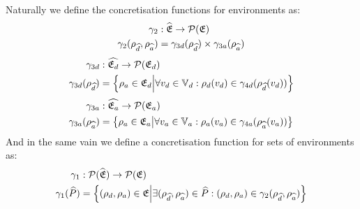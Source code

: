 Naturally we define the concretisation functions for environments as:
\begin{align}
    \gamma_2 &: \widehat{\mathfrak{E}} \rightarrow \mathcal{P}(\mathfrak{E}) \\
    \gamma_2(\rho_{\widehat{d}}, \rho_{\widehat{a}}) &= \gamma_{3d}(\rho_{\widehat{d}}) \times \gamma_{3a}(\rho_{\widehat{a}})
\end{align}
\begin{align}
    \gamma_{3d} &: \widehat{\mathfrak{E}_d} \rightarrow \mathcal{P}(\mathfrak{E}_d) \\
    \gamma_{3d}(\rho_{\widehat{d}}) &= \left\{ \rho_{a} \in \mathfrak{E}_d \middle| \forall v_d \in \mathbb{V}_d : \rho_d(v_d) \in \gamma_{4d}(\rho_{\widehat{d}}(v_d)) \right\}
\end{align}
\begin{align}
    \gamma_{3a} &: \widehat{\mathfrak{E}_a} \rightarrow \mathcal{P}(\mathfrak{E}_a) \\
    \gamma_{3a}(\rho_{\widehat{a}}) &= \left\{ \rho_{a} \in \mathfrak{E}_a \middle| \forall v_a \in \mathbb{V}_a : \rho_a(v_a) \in \gamma_{4a}(\rho_{\widehat{a}}(v_a)) \right\}
\end{align}
And in the same vain we define a concretisation function for sets of environments as:
\begin{align}
    \gamma_1 &: \mathcal{P}(\widehat{\mathfrak{E}}) \rightarrow \mathcal{P}(\mathfrak{E}) \\
    \gamma_1(\widehat{P}) &= \left\{ (\rho_{d}, \rho_{a}) \in \mathfrak{E} \middle| \exists (\rho_{\widehat{d}}, \rho_{\widehat{a}}) \in \widehat{P} : (\rho_{d}, \rho_{a}) \in \gamma_2(\rho_{\widehat{d}}, \rho_{\widehat{a}})\right\}
\end{align}

